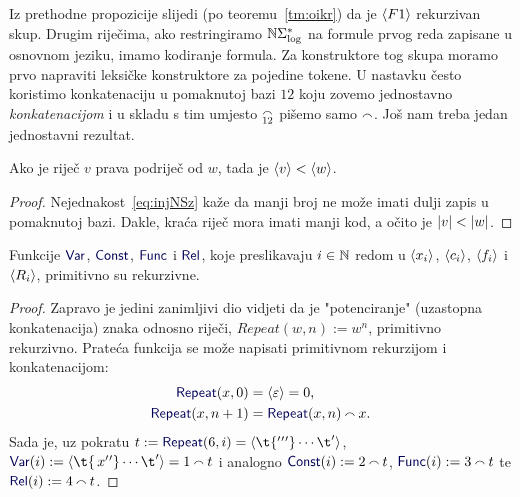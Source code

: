 Iz prethodne propozicije slijedi (po teoremu~\ref{tm:oikr}) da je $\langle F1\rangle$ rekurzivan skup. Drugim riječima, ako restringiramo ${\mathbb N}\Sigma_{\log}^*$ na formule prvog reda zapisane u osnovnom jeziku, imamo kodiranje formula. Za konstruktore tog skupa moramo prvo napraviti leksičke konstruktore za pojedine tokene. U nastavku često koristimo konkatenaciju u pomaknutoj bazi $12$ koju zovemo jednostavno \emph{konkatenacijom} i u skladu s tim umjesto $\conc{12}$ pišemo samo $\conc{}$. Još nam treba jedan jednostavni rezultat.

\begin{korolar}[{name=[(prava) podriječ ima (strogo) manji kod]}]\label{kor:krvw}
Ako je riječ $v$ prava podriječ od $w$, tada je $\langle v\rangle<\langle w\rangle$.
\end{korolar}
\begin{proof}
    Nejednakost~\eqref{eq:injNSz} kaže da manji broj ne može imati dulji zapis u pomaknutoj bazi. Dakle, kraća riječ mora imati manji kod, a očito je $\lvert v\rvert<\lvert w\rvert$.
\end{proof}

\begin{lema}[{name=[primitivna rekurzivnost leksičke strukture formula prvog reda]}]\label{lm:lexF1}
Funkcije $\f{Var}$, $\f{Const}$, $\f{Func}$ i $\f{Rel}$, koje preslikavaju $i\in{\mathbb N}$ redom u $\langle x_i\rangle$, $\langle c_i\rangle$, $\langle f_i\rangle$ i $\langle R_i\rangle$, primitivno su rekurzivne.
\end{lema}
\begin{proof}
Zapravo je jedini zanimljivi dio vidjeti da je "potenciranje" (uzastopna konkatenacija) znaka odnosno riječi, $Repeat(w,n):=w^n$, primitivno rekurzivno. Prateća funkcija se može napisati primitivnom rekurzijom i konkatenacijom:
\begin{align}
    \f{Repeat}(x,0)&=\kr{\varepsilon}=0\text,\\
    \f{Repeat}(x,n+1)&=\f{Repeat}(x,n)\conc{}x\text.
\end{align}
    Sada je, uz pokratu $t:=\f{Repeat}(6,i)=\kr{\t{'{}'{}'}\dotsm\t'}$, $\f{Var}(i):=\kr{\t{\,x{}'{}'}\dotsm\t'}=1\conc{}t$ i analogno $\f{Const}(i):=2\conc{}t$, $\f{Func}(i):=3\conc{}t$ te $\f{Rel}(i):=4\conc{}t$.
\end{proof}

